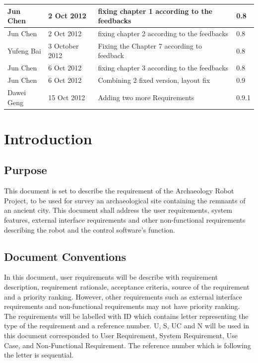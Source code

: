 \documentclass[11pt, a4paper]{report}
\begin{document}
\begin{tabular}{| l | l | l | l | }
Jun Chen	                &	2 Oct 2012		    &	fixing chapter 1 according to the feedbacks			&	0.8			\\ \hline
Jun Chen	                &	2 Oct 2012		    &	fixing chapter 2 according to the feedbacks			&	0.8 			\\ \hline
Yufeng Bai	                &	3 October 2012	    &	Fixing the Chapter 7 according to feedback	       &	0.8		\\ \hline
Jun Chen	                &	6 Oct 2012	        &	fixing chapter 3 according to the feedbacks			      &	0.8 			\\ \hline
Jun Chen	                &	6 Oct 2012	        &	Combining 2 fixed version, layout fix			             &	0.9 			\\ \hline
Dawei Geng                  & 15 Oct 2012           & Adding two more Requirements                                   &   0.9.1       \\ \hline




\end{tabular}
\clearpage


\chapter{Introduction}

\section{Purpose}
This document is set to describe the requirement of the Archaeology Robot Project, to be used for survey an archaeological site containing the remnants of an ancient city. This document shall address the user requirements, system features, external interface requirements and other non-functional requirements describing the robot and the control software's function. 


\section{Document Conventions}
In this document, user requirements will be describe with requirement description, requirement rationale, acceptance criteria, source of the requirement and a priority ranking. However, other requirements such as external interface requirements and non-functional requirements may not have priority ranking. 
The requirements will be labelled with ID which contains letter representing the type of the requirement and a reference number. U, S, UC and N will be used in this document corresponded to User Requirement, System Requirement, Use Case, and Non-Functional Requirement.  The reference number which is following the letter is sequential.
\end{document}
